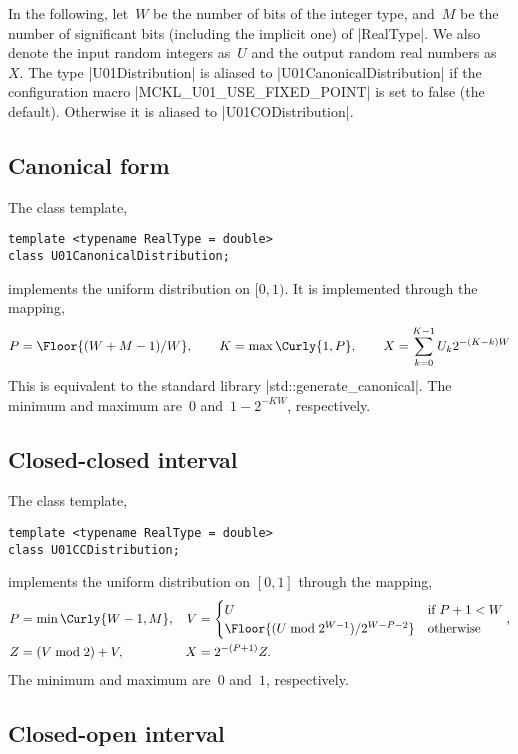 In the following, let~$W$ be the number of bits of the integer type, and~$M$ be
the number of significant bits (including the implicit one) of |RealType|. We
also denote the input random integers as~$U$ and the output random real numbers
as~$X$. The type |U01Distribution| is aliased to |U01CanonicalDistribution| if
the configuration macro |MCKL_U01_USE_FIXED_POINT| is set to false (the
default). Otherwise it is aliased to |U01CODistribution|.

\subsection{Canonical form}
\label{sub:Canonical form}

The class template,
\begin{verbatim}
template <typename RealType = double>
class U01CanonicalDistribution;
\end{verbatim}
implements the uniform distribution on $[0, 1)$. It is implemented through the
mapping,
\begin{equation*}
  P = \Floor{(W + M - 1) / W},\qquad
  K = \max\Curly{1, P},\qquad
  X = \sum_{k=0}^{K - 1} U_k 2^{-(K - k)W}
\end{equation*}
This is equivalent to the standard library |std::generate_canonical|. The
minimum and maximum are~$0$ and~$1 - 2^{-KW}$, respectively.

\subsection{Closed-closed interval}
\label{sub:Closed-closed interval}

The class template,
\begin{verbatim}
template <typename RealType = double>
class U01CCDistribution;
\end{verbatim}
implements the uniform distribution on $[0, 1]$ through the mapping,
\begin{align*}
  P &= \min\Curly{W - 1, M}, &
  V &= \begin{cases}
    U &\text{if } P + 1 < W \\
    \Floor{(U \bmod 2^{W - 1}) / 2^{W - P -2}} &\text{otherwise}
  \end{cases}, \\
  Z &= (V \bmod 2) + V, &
  X &= 2^{-(P + 1)} Z.
\end{align*}
The minimum and maximum are~$0$ and~$1$, respectively.

\subsection{Closed-open interval}
\label{sub:Closed-open interval}

